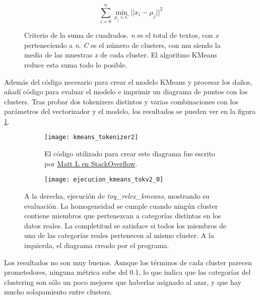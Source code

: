 \documentclass{pre-tfg}
\begin{document}
\begin{figure}[h]
	\begin{equation}
	\sum_{i=0}^{n}\min_{\mu_j \in C}{||x_i - \mu_j ||^2}
	\label{for:ineria}
	\end{equation}
	\caption{Criterio de la suma de cuadrados. \textit{n} es el total de textos, con \textit{x} perteneciendo a \textit{n}. \textit{C} es el número de clusters, con mu siendo la media de las muestras \textit{x} de cada cluster. El algoritmo KMeans reduce esta suma todo lo posible.}
	
\end{figure}

Además del código necesario para crear el modelo KMeans y procesar los daños, añadí código para evaluar el modelo e imprimir un diagrama de puntos con los clusters. Tras probar dos tokenizers distintos y varias combinaciones con los parámetros del vectorizador y el modelo, los resultados se pueden ver en la figura \ref{fig:kmeanresult}.

\begin{figure}[!h]
	\centering
	
	\begin{subfigure}{.4\textwidth}
		\texttt{[image: kmeans\_tokenizer2]}
		\caption[aaaaa]{El código utilizado para crear este diagrama fue escrito por \href{https://stackoverflow.com/questions/57626286/how-to-plot-text-clusters}{Matt L en StackOverflow}\protect\footnotemark.}
	\end{subfigure}%
	\begin{subfigure}{.5\textwidth}
		\centering
		\texttt{[image: ejecucion\_kmeans\_tokv2\_0]}
	\end{subfigure}
		
	\caption{A la derecha, ejecución de \textit{toy\_relex\_kmeans}, mostrando su evaluación. La homogeneidad se cumple cuando ningún cluster contiene miembros que pertenezcan a categorías distintas en los datos reales. La completitud se satisface si todos los miembros de una de las categorías reales pertenecen al mismo cluster. A la izquierda, el diagrama creado por el programa.}
	\label{fig:kmeanresult}
\end{figure}

Los resultados no son muy buenos. Aunque los términos de cada cluster parecen prometedores, ninguna métrica sube del 0.1, lo que indica que las categorías del clustering son sólo un poco mejores que haberlas asignado al azar, y que hay mucho solapamiento entre clusters.
\end{document}

